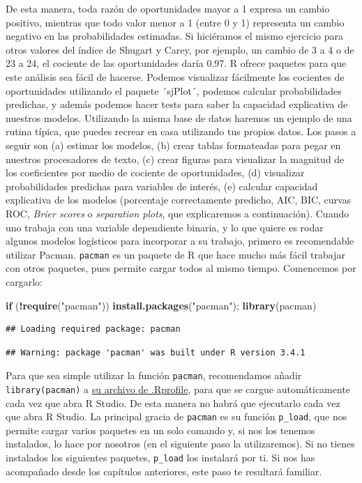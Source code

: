 \documentclass[]{book}
\newenvironment{Shaded}{\begin{snugshade}}{\end{snugshade}}
\newcommand{\KeywordTok}[1]{\textcolor[rgb]{0.13,0.29,0.53}{\textbf{#1}}}
\newcommand{\StringTok}[1]{\textcolor[rgb]{0.31,0.60,0.02}{#1}}
\newcommand{\ControlFlowTok}[1]{\textcolor[rgb]{0.13,0.29,0.53}{\textbf{#1}}}
\newcommand{\OperatorTok}[1]{\textcolor[rgb]{0.81,0.36,0.00}{\textbf{#1}}}
\newcommand{\NormalTok}[1]{#1}
\begin{document}
De esta manera, toda razón de oportunidades mayor a 1 expresa un cambio
positivo, mientras que todo valor menor a 1 (entre 0 y 1) representa un
cambio negativo en las probabilidades estimadas. Si hiciéramos el mismo
ejercicio para otros valores del índice de Shugart y Carey, por ejemplo,
un cambio de 3 a 4 o de 23 a 24, el cociente de las oportunidades daría
0.97. R ofrece paquetes para que este análisis sea fácil de hacerse.
Podemos visualizar fácilmente los cocientes de oportunidades utilizando
el paquete ´sjPlot´, podemos calcular probabilidades predichas, y además
podemos hacer tests para saber la capacidad explicativa de nuestros
modelos. Utilizando la misma base de datos haremos un ejemplo de una
rutina típica, que puedes recrear en casa utilizando tus propios datos.
Los pasos a seguir son (a) estimar los modelos, (b) crear tablas
formateadas para pegar en nuestros procesadores de texto, (c) crear
figuras para visualizar la magnitud de los coeficientes por medio de
cociente de oportunidades, (d) visualizar probabilidades predichas para
variables de interés, (e) calcular capacidad explicativa de los modelos
(porcentaje correctamente predicho, AIC, BIC, curvas ROC, \emph{Brier
scores} o \emph{separation plots}, que explicaremos a continuación).
Cuando uno trabaja con una variable dependiente binaria, y lo que quiere
es rodar algunos modelos logísticos para incorporar a su trabajo,
primero es recomendable utilizar Pacman. \texttt{pacman} es un paquete
de R que hace mucho más fácil trabajar con otros paquetes, pues permite
cargar todos al mismo tiempo. Comencemos por cargarlo:

\begin{Shaded}
\begin{Highlighting}[]
\ControlFlowTok{if}\NormalTok{ (}\OperatorTok{!}\KeywordTok{require}\NormalTok{(}\StringTok{"pacman"}\NormalTok{))}
    \KeywordTok{install.packages}\NormalTok{(}\StringTok{"pacman"}\NormalTok{); }\KeywordTok{library}\NormalTok{(pacman)  }
\end{Highlighting}
\end{Shaded}

\begin{verbatim}
## Loading required package: pacman
\end{verbatim}

\begin{verbatim}
## Warning: package 'pacman' was built under R version 3.4.1
\end{verbatim}

Para que sea simple utilizar la función \texttt{pacman}, recomendamos
añadir \texttt{library(pacman)} a
\href{http://www.statmethods.net/interface/customizing.html}{su archivo
de .Rprofile}, para que se cargue automáticamente cada vez que abra R
Studio. De esta manera no habrá que ejecutarlo cada vez que abra R
Studio. La principal gracia de \texttt{pacman} es su función
\texttt{p\_load}, que nos permite cargar varios paquetes en un solo
comando y, si nos los tenemos instalados, lo hace por nosotros (en el
siguiente paso la utilizaremos). Si no tienes instalados los siguientes
paquetes, \texttt{p\_load} los instalará por ti. Si nos has acompañado
desde los capítulos anteriores, este paso te resultará familiar.
\end{document}
